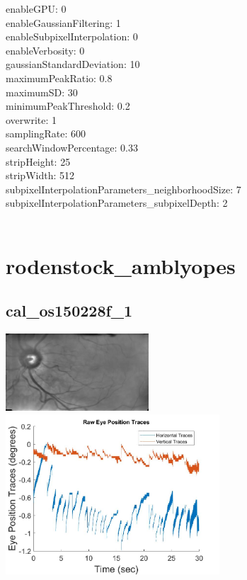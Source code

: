 \documentclass[11pt]{article}
\begin{document}
enableGPU: 0\\
enableGaussianFiltering: 1\\
enableSubpixelInterpolation: 0\\
enableVerbosity: 0\\
gaussianStandardDeviation: 10\\
maximumPeakRatio: 0.8\\
maximumSD: 30\\
minimumPeakThreshold: 0.2\\
overwrite: 1\\
samplingRate: 600\\
searchWindowPercentage: 0.33\\
stripHeight: 25\\
stripWidth: 512\\
subpixelInterpolationParameters\_neighborhoodSize: 7\\
subpixelInterpolationParameters\_subpixelDepth: 2\\
\\
\newpage

\section{rodenstock\_amblyopes}

\subsection{cal\_os150228f\_1}
\includegraphics[width=0.40\textwidth, valign=m]{referenceframes/rodenstock_amblyopes/cal_os150228f_1_dwt_nostim_gamscaled_bandfilt_refframe.jpg}
\includegraphics[width=0.60\textwidth, valign=m]{eyepositiontraces/rodenstock_amblyopes/cal_os150228f_1.jpg}\\
\end{document}
